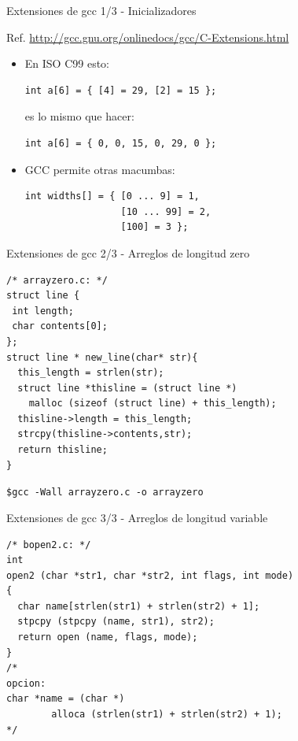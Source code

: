 \documentclass[xetex]{beamer}
\begin{document}
\begin{frame}[fragile]{Extensiones de gcc 1/3 - Inicializadores}

Ref. \url{http://gcc.gnu.org/onlinedocs/gcc/C-Extensions.html}
\begin{itemize}
  \item En ISO C99 esto:
\begin{lstlisting}
int a[6] = { [4] = 29, [2] = 15 };
\end{lstlisting}
    es lo mismo que hacer:
\begin{lstlisting}
int a[6] = { 0, 0, 15, 0, 29, 0 };
\end{lstlisting}

  \item GCC permite otras macumbas:
\begin{lstlisting}
int widths[] = { [0 ... 9] = 1, 
                 [10 ... 99] = 2,  
                 [100] = 3 };
\end{lstlisting}

\end{itemize}
  
\end{frame}

\begin{frame}[fragile]{Extensiones de gcc 2/3 - Arreglos de longitud zero}
  
\begin{lstlisting}
/* arrayzero.c: */
struct line {
 int length;
 char contents[0];
};
struct line * new_line(char* str){
  this_length = strlen(str);
  struct line *thisline = (struct line *)
    malloc (sizeof (struct line) + this_length);
  thisline->length = this_length;
  strcpy(thisline->contents,str);
  return thisline;
}
\end{lstlisting}

\verb=$gcc -Wall arrayzero.c -o arrayzero=

\end{frame}

\begin{frame}[fragile]{Extensiones de gcc 3/3 - Arreglos de longitud variable}
  
\begin{lstlisting}
/* bopen2.c: */
int
open2 (char *str1, char *str2, int flags, int mode)
{
  char name[strlen(str1) + strlen(str2) + 1];
  stpcpy (stpcpy (name, str1), str2);
  return open (name, flags, mode);
}
/*
opcion:
char *name = (char *) 
        alloca (strlen(str1) + strlen(str2) + 1);
*/
\end{lstlisting}  
\end{frame}
\end{document}
